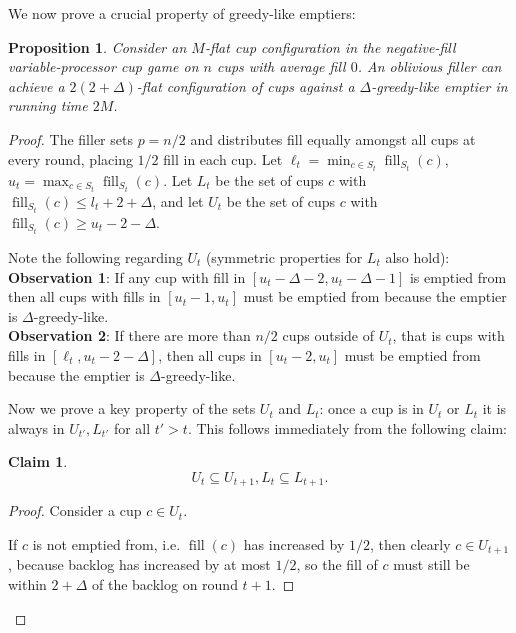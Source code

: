 \documentclass[twocolumn]{article}[10pt]
\DeclareMathOperator{\fil}{\text{fill}}
\newtheorem{proposition}{Proposition}
\newtheorem{clm}{Claim}
\begin{document}
We now prove a crucial property of greedy-like emptiers: 
\begin{proposition}
  \label{prop:greedylikeisflat}
  Consider an $M$-flat cup configuration in the negative-fill variable-processor cup
  game on $n$ cups with average fill $0$.
  An oblivious filler can achieve a $2(2+\Delta)$-flat configuration of cups against a $\Delta$-greedy-like
  emptier in running time $2M$.
\end{proposition}
\begin{proof}
  The filler sets $p=n/2$ and distributes fill equally amongst
  all cups at every round, placing $1/2$ fill in each cup.
  Let $\ell_t = \min_{c\in S_t} \fil_{S_t}(c)$, $u_t=\max_{c\in S_t} \fil_{S_t}(c)$. Let
  $L_t$ be the set of cups $c$ with $\fil_{S_t}(c) \le l_t+2+\Delta$, and let
  $U_t$ be the set of cups $c$ with $\fil_{S_t}(c) \ge u_t-2-\Delta$.
  
  Note the following regarding $U_t$ (symmetric properties for $L_t$ also hold):\\
  \textbf{Observation 1}: 
  If any cup with fill in $[u_t-\Delta-2, u_t-\Delta-1]$ is emptied from then all cups
  with fills in $[u_t-1, u_t]$ must be emptied from because the emptier is
  $\Delta$-greedy-like. \\
  \textbf{Observation 2}:
  If there are more than $n/2$ cups outside of $U_t$, that is cups with fills in $[\ell_t, u_t-2-\Delta]$, then all cups in $[u_t-2, u_t]$ must be emptied from because the emptier is $\Delta$-greedy-like.

  Now we prove a key property of the sets $U_t$ and $L_t$: once a cup is in
  $U_t$ or $L_t$ it is always in $U_{t'}, L_{t'}$ for all $t' > t$. This
  follows immediately from the following claim:
  \begin{clm}
    \label{clm:dontlosestuff}
    $$U_{t} \subseteq U_{t+1}, L_t \subseteq L_{t+1}.$$
  \end{clm}
  \begin{proof}
    Consider a cup $c\in U_t$.

    If $c$ is not emptied from, i.e. $\fil(c)$ has increased by $1/2$, then
    clearly $c \in U_{t+1}$, because backlog has increased by at most $1/2$, so
    the fill of $c$ must still be within $2+\Delta$ of the backlog on round $t+1$. 


\end{proof}
\end{proof}
\end{document}
